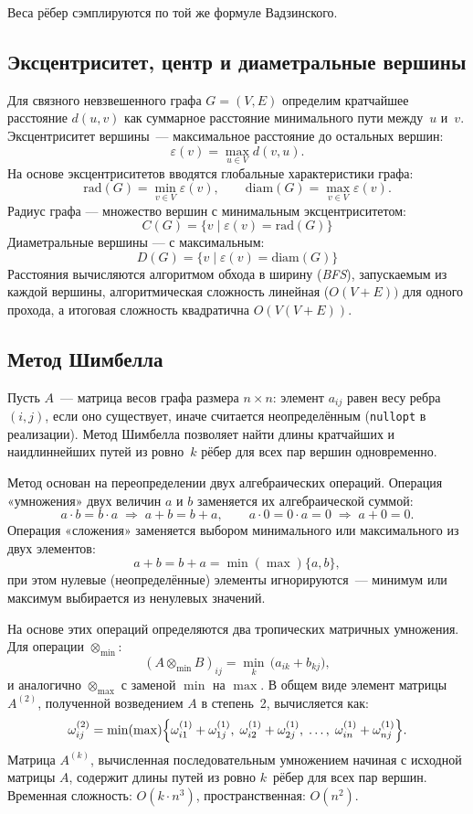 Веса рёбер сэмплируются по той же формуле Вадзинского.

\subsection{Эксцентриситет, центр и диаметральные вершины}

Для связного невзвешенного графа $G = (V, E)$ определим кратчайшее расстояние
$d(u, v)$ как суммарное расстояние минимального пути между~$u$ и~$v$.
Эксцентриситет вершины~--- максимальное расстояние до остальных вершин:
\[
    \varepsilon(v) = \max_{u \in V} d(v, u).
\]
На основе эксцентриситетов вводятся глобальные характеристики графа:
\[
    \mathrm{rad}(G)  = \min_{v \in V} \varepsilon(v), \qquad
    \mathrm{diam}(G) = \max_{v \in V} \varepsilon(v).
\]
Радиус графа --- множество вершин с минимальным эксцентриситетом:
\[
C(G) = \{v \mid \varepsilon(v) = \mathrm{rad}(G)\}
\]
Диаметральные вершины --- с максимальным:
\[
D(G) = \{v \mid \varepsilon(v) = \mathrm{diam}(G)\}
\]
Расстояния вычисляются алгоритмом обхода в ширину (\textit{BFS}), запускаемым из каждой вершины, алгоритмическая
сложность линейная ($O(V + E))$ для одного прохода, а итоговая сложность квадратична $O(V(V+E))$.

\subsection{Метод Шимбелла}

Пусть $A$~--- матрица весов графа размера $n \times n$: элемент $a_{ij}$
равен весу ребра $(i, j)$, если оно существует, иначе считается
неопределённым (\texttt{nullopt} в реализации). Метод Шимбелла позволяет
найти длины кратчайших и наидлиннейших путей из ровно~$k$ рёбер
для всех пар вершин одновременно.

Метод основан на переопределении двух алгебраических операций.
Операция «умножения» двух величин $a$ и $b$ заменяется их алгебраической
суммой:
\[
    a \cdot b = b \cdot a \;\Rightarrow\; a + b = b + a, \qquad
    a \cdot 0 = 0 \cdot a = 0 \;\Rightarrow\; a + 0 = 0.
\]
Операция «сложения» заменяется выбором минимального или максимального
из двух элементов:
\[
    a + b = b + a = \min(\max)\{a, b\},
\]
при этом нулевые (неопределённые) элементы игнорируются~--- минимум
или максимум выбирается из ненулевых значений.

На основе этих операций определяются два тропических матричных умножения.
Для операции $\otimes_{\min}$:
\[
    (A \otimes_{\min} B)_{ij}
    = \min_{k}\,\bigl(a_{ik} + b_{kj}\bigr),
\]
и аналогично $\otimes_{\max}$ с заменой $\min$ на $\max$. В общем виде
элемент матрицы $A^{(2)}$, полученной возведением $A$ в степень~2,
вычисляется как:
\[
    \omega_{ij}^{(2)} = \min(\max)
    \Bigl\{
        \omega_{i1}^{(1)} + \omega_{1j}^{(1)},\;
        \omega_{i2}^{(1)} + \omega_{2j}^{(1)},\;
        \ldots,\;
        \omega_{in}^{(1)} + \omega_{nj}^{(1)}
    \Bigr\}.
\]
Матрица $A^{(k)}$, вычисленная последовательным умножением начиная
с исходной матрицы $A$, содержит длины путей из ровно
$k$~рёбер для всех пар вершин. Временная сложность: $O(k \cdot n^3)$,
пространственная: $O(n^2)$.

